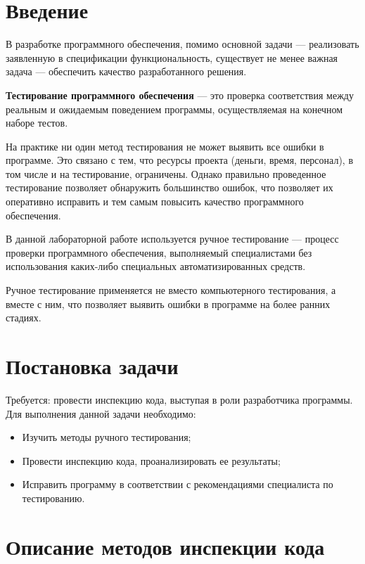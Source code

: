 \documentclass[11pt,a4paper,final]{article} %
\begin{document}
\newpage

\tableofcontents

\newpage
\section* {Введение}
В разработке программного обеспечения, помимо основной задачи — реализовать заявленную в спецификации функциональность, существует не менее важная задача — обеспечить качество разработанного решения. 

\textbf{Тестирование программного обеспечения} — это проверка соответствия между реальным и ожидаемым поведением программы, осуществляемая на конечном наборе тестов.

На практике ни один метод тестирования не может выявить все ошибки в программе. Это связано с тем, что ресурсы проекта (деньги, время, персонал), в том числе и на тестирование, ограничены. Однако правильно проведенное тестирование позволяет обнаружить большинство ошибок, что позволяет их оперативно исправить и тем самым повысить качество программного обеспечения.

В данной лабораторной работе используется ручное тестирование — процесс проверки программного обеспечения, выполняемый специалистами без использования каких-либо специальных автоматизированных средств.

Ручное тестирование применяется не вместо компьютерного тестирования, а вместе с ним, что позволяет выявить ошибки в программе на более ранних стадиях.

\newpage
\section{Постановка задачи}

\noindent
Требуется: провести инспекцию кода, выступая в роли разработчика программы. \\
Для выполнения данной задачи необходимо:

\begin{itemize}
	\item Изучить методы ручного тестирования;
	\item Провести инспекцию кода, проанализировать ее результаты;
	\item Исправить программу в соответствии с рекомендациями специалиста по тестированию.
\end{itemize}


\newpage
\section{Описание методов инспекции кода}
\end{document}
